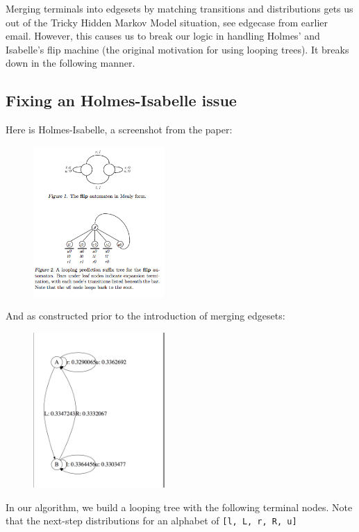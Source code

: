 \documentclass{article}
\begin{document}
Merging terminals into edgesets by matching transitions and distributions gets
us out of the Tricky Hidden Markov Model situation, see edgecase from earlier
email. However, this causes us to break our logic in handling Holmes' and
Isabelle's flip machine (the original motivation for using looping trees). It
breaks down in the following manner.

\subsection{Fixing an Holmes-Isabelle issue}

Here is Holmes-Isabelle, a screenshot from the paper:

\begin{figure}[h!]
\centering
\includegraphics[width=50mm,scale=0.5]{imgs/flip-mealy.png}
\label{fig:method}
\end{figure}

And as constructed prior to the introduction of merging edgesets:

\begin{figure}[h!]
\centering
\includegraphics[width=50mm,scale=0.5]{imgs/flip-no-merge.png}
\label{fig:method}
\end{figure}


\newpage


In our algorithm, we build a looping tree with the following terminal nodes.
Note that the next-step distributions for an alphabet of {\tt [l, L, r, R, u]}
\end{document}
